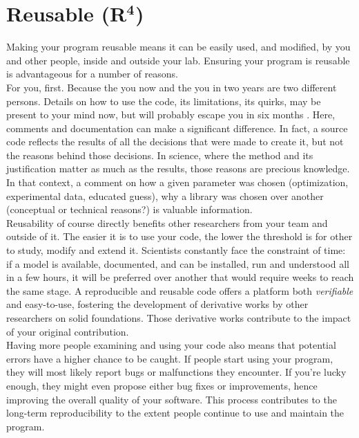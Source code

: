 \documentclass[a4paper,11pt]{article}
\begin{document}
\section*{Reusable (R$^{\mathbf 4}$)}

Making your program reusable means it can be easily used, and modified, by you and other people, inside and outside your lab. Ensuring your program is reusable is advantageous for a number of reasons.\\

For you, first. Because the you now and the you in two years are two different persons. Details on how to use the code, its limitations, its quirks, may be present to your mind now, but will probably escape you in six months \parencite{Donoho:2009}. Here, comments and documentation can make a significant difference. In fact, a source code reflects the results of all the decisions that were made to create it, but not the reasons behind those decisions. In science, where the method and its justification matter as much as the results, those reasons are precious knowledge. In that context, a comment on how a given parameter was chosen (optimization, experimental data, educated guess), why a library was chosen over another (conceptual or technical reasons?) is valuable information.\\

Reusability of course directly benefits other researchers from your team and outside of it. The easier it is to use your code, the lower the threshold is for other to study, modify and extend it. Scientists constantly face the constraint of time: if a model is available, documented, and can be installed, run and understood all in a few hours, it will be preferred over another that would require weeks to reach the same stage. A reproducible and reusable code offers a platform both \emph{verifiable} and easy-to-use, fostering the development of derivative works by other researchers on solid foundations. Those derivative works contribute to the impact of your original contribution.\\

Having more people examining and using your code also means that potential errors have a higher chance to be caught. If people start using your program, they will most likely report bugs or malfunctions they encounter. If you're lucky enough, they might even propose either bug fixes or improvements, hence improving the overall quality of your software. This process contributes to the long-term reproducibility to the extent people continue to use and maintain the program.\\
\end{document}

